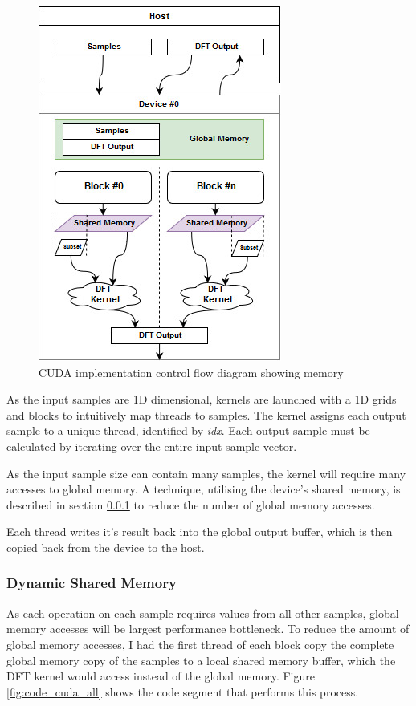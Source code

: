 \documentclass[11pt,a4paper]{article}
\begin{document}
\begin{figure}
\begin{center}
\includegraphics[scale=0.6]{cuda_impl1}
\end{center}
\caption{CUDA implementation control flow diagram showing memory }
\label{fig:cuda_impl1}
\end{figure}

As the input samples are 1D dimensional, kernels are launched with a 1D grids and blocks to intuitively map threads to samples.
 The kernel assigns each output sample to a unique thread, identified by \textit{idx}. Each output sample must be calculated by iterating over the entire input sample vector. 

As the input sample size can contain many samples, the kernel will require many accesses to global memory. A technique, utilising the device's shared memory, is described in section \ref{sect:Dynamic Shared Memory} to reduce the number of global memory accesses.

Each thread writes it's result back into the global output buffer, which is then copied back from the device to the host.

\subsubsection{Dynamic Shared Memory} \label{sect:Dynamic Shared Memory}
As each operation on each sample requires values from all other samples, global memory accesses will be largest performance bottleneck. To reduce the amount of global memory accesses, I had the first thread of each block copy the complete global memory copy of the samples to a local shared memory buffer, which the DFT kernel would access instead of the global memory. Figure \ref{fig:code_cuda_all} shows the code segment that performs this process.
\end{document}
